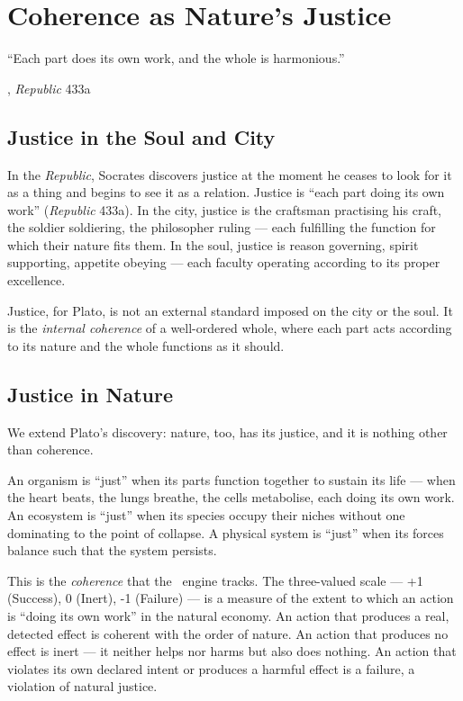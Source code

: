 \chapter{Coherence as Nature's Justice}

\epigraph{``Each part does its own work, and the whole is harmonious.''}{\textcite{plato1997complete},
\emph{Republic} 433a}

\section{Justice in the Soul and City}

In the \emph{Republic}, Socrates discovers justice at the moment he ceases to
look for it as a thing and begins to see it as a relation. Justice is ``each
part doing its own work'' (\emph{Republic} 433a). In the city, justice is the
craftsman practising his craft, the soldier soldiering, the philosopher ruling
--- each fulfilling the function for which their nature fits them. In the soul,
justice is reason governing, spirit supporting, appetite obeying --- each
faculty operating according to its proper excellence.

Justice, for Plato, is not an external standard imposed on the city or the soul.
It is the \emph{internal coherence} of a well-ordered whole, where each part
acts according to its nature and the whole functions as it should.

\section{Justice in Nature}

We extend Plato's discovery: nature, too, has its justice, and it is nothing
other than coherence.

An organism is ``just'' when its parts function together to sustain its life ---
when the heart beats, the lungs breathe, the cells metabolise, each doing its
own work. An ecosystem is ``just'' when its species occupy their niches without
one dominating to the point of collapse. A physical system is ``just'' when its
forces balance such that the system persists.

This is the \emph{coherence} that the \physis\ engine tracks. The three-valued
scale --- +1 (Success), 0 (Inert), -1 (Failure) --- is a measure of the extent
to which an action is ``doing its own work'' in the natural economy. An action
that produces a real, detected effect is coherent with the order of nature. An
action that produces no effect is inert --- it neither helps nor harms but also
does nothing. An action that violates its own declared intent or produces a
harmful effect is a failure, a violation of natural justice.

